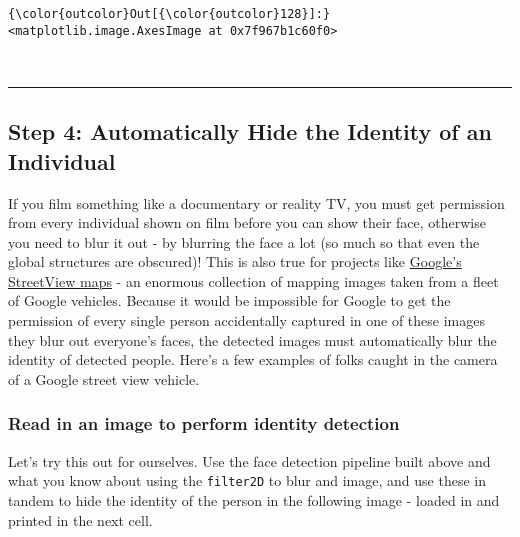 \documentclass[11pt]{article}
\begin{document}
\begin{Verbatim}[commandchars=\\\{\}]
{\color{outcolor}Out[{\color{outcolor}128}]:} <matplotlib.image.AxesImage at 0x7f967b1c60f0>
\end{Verbatim}
            
    \begin{center}
    \end{center}
    { \hspace*{\fill} \\}
    
    \begin{center}\rule{0.5\linewidth}{\linethickness}\end{center}

\hypertarget{step-4-automatically-hide-the-identity-of-an-individual}{%
\subsection{Step 4: Automatically Hide the Identity of an
Individual}\label{step-4-automatically-hide-the-identity-of-an-individual}}

If you film something like a documentary or reality TV, you must get
permission from every individual shown on film before you can show their
face, otherwise you need to blur it out - by blurring the face a lot (so
much so that even the global structures are obscured)! This is also true
for projects like \href{https://www.google.com/streetview/}{Google's
StreetView maps} - an enormous collection of mapping images taken from a
fleet of Google vehicles. Because it would be impossible for Google to
get the permission of every single person accidentally captured in one
of these images they blur out everyone's faces, the detected images must
automatically blur the identity of detected people. Here's a few
examples of folks caught in the camera of a Google street view vehicle.

 

    \hypertarget{read-in-an-image-to-perform-identity-detection}{%
\subsubsection{Read in an image to perform identity
detection}\label{read-in-an-image-to-perform-identity-detection}}

Let's try this out for ourselves. Use the face detection pipeline built
above and what you know about using the \texttt{filter2D} to blur and
image, and use these in tandem to hide the identity of the person in the
following image - loaded in and printed in the next cell.
\end{document}
